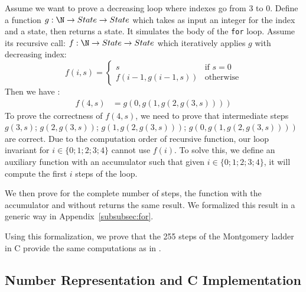 Assume we want to prove a decreasing loop where indexes go from 3 to 0.
Define a function $g : \N \rightarrow State  \rightarrow State $ which takes as
input an integer for the index and a state, then returns a state.
It simulates the body of the \texttt{for} loop.
Assume its recursive call: $f : \N \rightarrow State \rightarrow State $ which
iteratively applies $g$ with decreasing index:
\begin{equation*}
  f ( i , s ) =
  \begin{cases}
  s & \text{if } s = 0 \\
  f( i - 1 , g ( i - 1  , s )) & \text{otherwise}
  \end{cases}
\end{equation*}
Then we have :
\begin{align*}
  f(4,s) &= g(0,g(1,g(2,g(3,s))))
\end{align*}
To prove the correctness of $f(4,s)$, we need to prove that intermediate steps
$g(3,s)$; $g(2,g(3,s))$; $g(1,g(2,g(3,s)))$; $g(0,g(1,g(2,g(3,s))))$ are correct.
Due to the computation order of recursive function, our loop invariant for
$i\in\{0;1;2;3;4\}$ cannot use $f(i)$.
To solve this, we define an auxiliary function with an accumulator such that
given $i\in\{0;1;2;3;4\}$, it will compute the first $i$ steps of the loop.

We then prove for the complete number of steps, the function with the accumulator
and without returns the same result.
We formalized this result in a generic way in Appendix~\ref{subsubsec:for}.

Using this formalization, we prove that the 255 steps of the Montgomery ladder
in C provide the same computations as in .





\subsection{Number Representation and C Implementation}
\label{subsec:num-repr-rfc}

